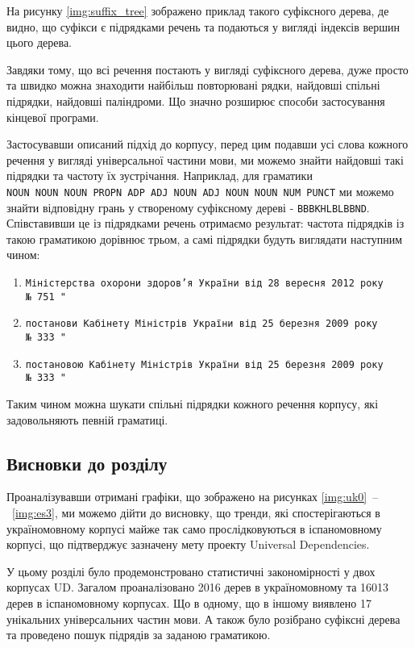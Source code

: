 На рисунку \ref{img:suffix_tree} зображено приклад такого суфіксного дерева,
де видно, що суфікси є підрядками речень та подаються у вигляді індексів
вершин цього дерева.

Завдяки тому, що всі речення постають у вигляді суфіксного дерева, дуже просто
та швидко можна знаходити найбільш повторювані рядки, найдовші спільні
підрядки, найдовші паліндроми. Що значно розширює способи застосування
кінцевої програми.

Застосувавши описаний підхід до корпусу, перед цим подавши усі слова кожного
речення у вигляді універсальної частини мови, ми можемо знайти найдовші такі
підрядки та частоту їх зустрічання. Наприклад, для граматики
\texttt{NOUN~NOUN~NOUN~PROPN~ADP~ADJ~NOUN~ADJ~NOUN~NOUN~NUM~PUNCT} ми можемо
знайти відповідну грань у створеному суфіксному дереві - \texttt{BBBKHLBLBBND}.
Співставивши це із підрядками речень отримаємо результат: частота підрядків
із такою граматикою дорівнює трьом, а самі підрядки будуть виглядати наступним
чином: 
\begin{enumerate}
    \item \texttt{Міністерства охорони здоров’я України від 28 вересня 2012 року
    №~751~"}
    \item \texttt{постанови Кабінету Міністрів України від 25 березня 2009 року
    №~333~"}
    \item \texttt{постановою Кабінету Міністрів України від 25 березня 2009 року 
    №~333~"}
\end{enumerate}

Таким чином можна шукати спільні підрядки кожного речення корпусу, які
задовольняють певній граматиці. 


\subsection*{Висновки до розділу }
Проаналізувавши отримані графіки, що зображено на рисунках
\ref{img:uk0}~\nobreakdash--~\ref{img:es3},
ми можемо дійти до висновку, що тренди, які
спостерігаються в україномовному корпусі майже так само прослідковуються в
іспаномовному корпусі, що підтверджує зазначену мету проекту Universal Dependencies.

У цьому розділі було продемонстровано статистичні закономірності у двох
корпусах UD. Загалом проаналізовано 2016 дерев в україномовному та 16013 дерев
в іспаномовному корпусах. Що в одному, що в іншому виявлено 17 унікальних
універсальних частин мови. А також було розібрано суфіксні дерева та проведено
пошук підрядів за заданою граматикою.